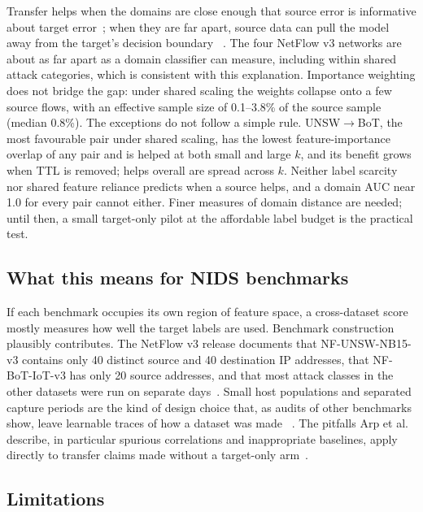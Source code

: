 \documentclass[11pt]{article}
\begin{document}
Transfer helps when the domains are close enough that source error is informative about target error~\cite{bendavid2010theory}; when they are far apart, source data can pull the model away from the target's decision boundary ~\cite{pan2010survey,zhang2023negative}. The four NetFlow v3 networks are about as far apart as a domain classifier can measure, including within shared attack categories, which is consistent with this explanation. Importance weighting does not bridge the gap: under shared scaling the weights collapse onto a few source flows, with an effective sample size of 0.1--3.8\% of the source sample (median 0.8\%). The exceptions do not follow a simple rule. UNSW$\to$BoT, the most favourable pair under shared scaling, has the lowest feature-importance overlap of any pair and is helped at both small and large $k$, and its benefit grows when TTL is removed; helps overall are spread across $k$. Neither label scarcity nor shared feature reliance predicts when a source helps, and a domain AUC near 1.0 for every pair cannot either. Finer measures of domain distance are needed; until then, a small target-only pilot at the affordable label budget is the practical test.

\subsection{What this means for NIDS benchmarks}

If each benchmark occupies its own region of feature space, a cross-dataset score mostly measures how well the target labels are used. Benchmark construction plausibly contributes. The NetFlow v3 release documents that NF-UNSW-NB15-v3 contains only 40 distinct source and 40 destination IP addresses, that NF-BoT-IoT-v3 has only 20 source addresses, and that most attack classes in the other datasets were run on separate days~\cite{luay2025temporal}. Small host populations and separated capture periods are the kind of design choice that, as audits of other benchmarks show, leave learnable traces of how a dataset was made ~\cite{flood2024bad,goldschmidt2025network}. The pitfalls Arp et al. describe, in particular spurious correlations and inappropriate baselines, apply directly to transfer claims made without a target-only arm~\cite{arp2022dos}.

\subsection{Limitations}
\end{document}
